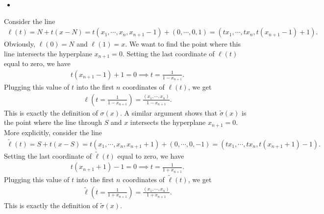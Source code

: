 \answer{}
\begin{itemize}
    \item [(a)]
\end{itemize}
Consider the line 
\begin{align}
    \ell(t)=N+t(x-N)=t(x_1,\cdots,x_n,x_{n+1}-1)+(0,\cdots,0,1)=(tx_1,\cdots,tx_n,t(x_{n+1}-1)+1).
\end{align}
Obviously, $\ell(0)=N$ and $\ell(1)=x$. We want to find the point where this line intersects the hyperplane $x_{n+1}=0$. Setting the last coordinate of $\ell(t)$ equal to zero, we have
\begin{align}
    t(x_{n+1}-1)+1=0\implies t=\frac{1}{1-x_{n+1}}.
\end{align}
Plugging this value of $t$ into the first $n$ coordinates of $\ell(t)$, we get
\begin{align}
    \ell\left(t=\frac{1}{1-x_{n+1}}\right)=\frac{(x_1,\cdots,x_n)}{1-x_{n+1}}.
\end{align}
This is exactly the definition of $\sigma(x)$. A similar argument shows that $\tilde{\sigma}(x)$ is the point where the line through $S$ and $x$ intersects the hyperplane $x_{n+1}=0$. More explicitly, consider the line
\begin{align}
    \tilde{\ell}(t)=S+t(x-S)=t(x_1,\cdots,x_n,x_{n+1}+1)+(0,\cdots,0,-1)=(tx_1,\cdots,tx_n,t(x_{n+1}+1)-1).
\end{align}
Setting the last coordinate of $\tilde{\ell}(t)$ equal to zero, we have
\begin{align}
    t(x_{n+1}+1)-1=0\implies t=\frac{1}{1+x_{n+1}}.
\end{align}
Plugging this value of $t$ into the first $n$ coordinates of $\tilde{\ell}(t)$, we get
\begin{align}
    \tilde{\ell}\left(t=\frac{1}{1+x_{n+1}}\right)=\frac{(x_1,\cdots,x_n)}{1+x_{n+1}}.
\end{align}
This is exactly the definition of $\tilde{\sigma}(x)$.

